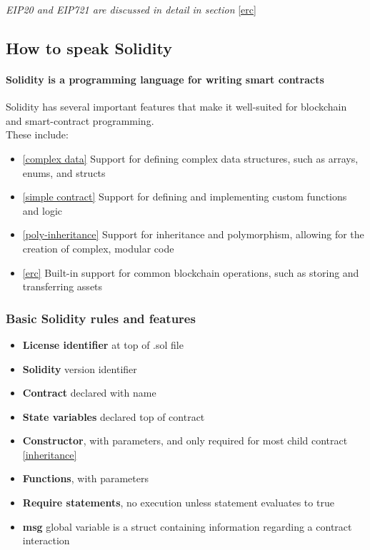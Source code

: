 \documentclass{article}
\theoremstyle{theorem}
\theoremstyle{definition}
\theoremstyle{remark}
\begin{document}
\medskip\noindent
\textit{EIP20 and EIP721 are discussed in detail in section} \ref{erc}


\subsection{How to speak Solidity}

\paragraph{Solidity is a programming language for writing smart contracts}Solidity has several important features that make it well-suited for blockchain and smart-contract programming. \\These include:

\begin{itemize}
\item \ref{complex data} Support for defining complex data structures, such as arrays, enums, and structs
\item \ref{simple contract} Support for defining and implementing custom functions and logic
\item \ref{poly-inheritance} Support for inheritance and polymorphism, allowing for the creation of complex, modular code
\item \ref{erc} Built-in support for common blockchain operations, such as storing and transferring assets
\end{itemize}

\subsubsection{Basic Solidity rules and features}\label{core aspects}

\begin{itemize}
    \item {\bf License identifier} at top of .sol file
    \item {\bf Solidity} version identifier
    \item {\bf Contract} declared with name
    \item {\bf State variables} declared top of contract
    \item {\bf Constructor}, with parameters, and only required for most child contract \ref{inheritance}
    \item {\bf Functions}, with parameters
    \item {\bf Require statements}, no execution unless statement evaluates to true 
    \item {\bf msg} global variable is a struct containing information regarding a contract interaction 
\end{itemize}
\end{document}
